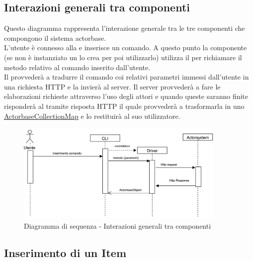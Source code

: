 \documentclass{scalatekids-article}
\begin{document}
\subsection{Interazioni generali tra componenti}
Questo diagramma rappresenta l'interazione generale tra le tre componenti che
compongono il sistema actorbase.\\
L'utente è connesso alla  e inserisce un comando. A questo punto la
componente  (se non è instanziato un  lo crea per poi
utilizzarlo) utilizza il  per richiamare il metodo relativo al
comando inserito dall'utente.\\Il {} provvederà a tradurre il
comando coi relativi parametri immessi dall'utente in una richiesta HTTP
e la invierà al server. Il server provvederà a fare le elaborazioni richieste attraverso l'uso
degli attori e quando queste saranno finite risponderà al 
tramite risposta HTTP il quale provvederà a trasformarla in uno
\hyperref[sec:driver::actorbasedata::ActorbaseCollectionMap]{ActorbaseCollectionMap} e lo
restituirà al suo utilizzatore.
\begin{figure}[H]
  \begin{center}
    \includegraphics[width=0.9\textwidth, keepaspectratio]{img/diagrammiSequenza/ScambioMessaggiGenerico.png}
    \caption{Diagramma di sequenza - Interazioni generali tra componenti}
  \end{center}
\end{figure}

\subsection{Inserimento di un Item}
\end{document}
